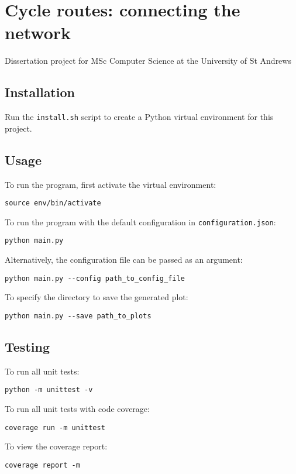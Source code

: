 \hypertarget{cycle-routes-connecting-the-network}{%
\section*{Cycle routes: connecting the
network}\label{cycle-routes-connecting-the-network}}

Dissertation project for MSc Computer Science at the University of St
Andrews

\hypertarget{installation}{%
\subsection*{Installation}\label{installation}}

Run the \texttt{install.sh} script to create a Python virtual
environment for this project.

\hypertarget{usage}{%
\subsection*{Usage}\label{usage}}

To run the program, first activate the virtual environment:

\begin{verbatim}
source env/bin/activate
\end{verbatim}

To run the program with the default configuration in
\texttt{configuration.json}:

\begin{verbatim}
python main.py
\end{verbatim}

Alternatively, the configuration file can be passed as an argument:

\begin{verbatim}
python main.py --config path_to_config_file
\end{verbatim}

To specify the directory to save the generated plot:

\begin{verbatim}
python main.py --save path_to_plots
\end{verbatim}

\hypertarget{testing}{%
\subsection*{Testing}\label{testing}}

To run all unit tests:

\begin{verbatim}
python -m unittest -v
\end{verbatim}

To run all unit tests with code coverage:

\begin{verbatim}
coverage run -m unittest
\end{verbatim}

To view the coverage report:

\begin{verbatim}
coverage report -m
\end{verbatim}
